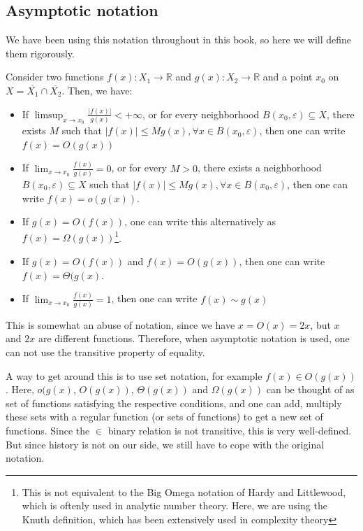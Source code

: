 \subsection{Asymptotic notation} %
\label{sub:Asymptotic notation}

We have been using this notation throughout in this book, so here we will define
them rigorously.

\begin{definition}
\label{def:Asymptotic notation}
  Consider two functions \( f(x): X_{1} \to  \mathbb{R} \) and \( g(x): X_{2}
  \to \mathbb{R} \) and a point \( x_{0} \) on \( X = \overline{X_{1}} \cap
  \overline{X_{2}}  \). Then, we have:
  \begin{itemize}
  \item If \( \limsup_{x \to x_{0}} \frac{|f(x)|}{g(x)} < +\infty \), or for every
    neighborhood \( B(x_{0}, \varepsilon) \subseteq X \), there exists \( M \)
    such that \( |f(x)| \le Mg(x), \forall x \in B(x_{0}, \varepsilon) \), then
    one can write \( f(x) = O(g(x)) \)
  \item If \( \lim_{x \to x_{0}} \frac{f(x)}{g(x)} = 0 \), or for every \( 
    M > 0\), there exists a neighborhood \( B(x_{0}, \varepsilon) \subseteq X\)
    such that \( |f(x)| \le Mg(x), \forall  x \in B(x_{0}, \varepsilon) \), then
    one can write \( f(x) = o(g(x)) \).
  \item If \( g(x) = O(f(x)) \), one can write this alternatively as \( f(x) =
    \Omega(g(x)) \)\footnote{This is not equivalent to the Big Omega notation of
    Hardy and Littlewood, which is oftenly used in analytic number theory. Here,
    we are using the Knuth definition, which has been extensively used in
    complexity theory}.
  \item If \( g(x) = O(f(x)) \) and \( f(x) = O(g(x)) \), then one can write \(
    f(x) = \Theta(g(x)\).
  \item If \( \lim_{x \to x_{0}} \frac{f(x)}{g(x)} = 1 \), then one can write \(
    f(x) \sim g(x)\)
  \end{itemize}
\end{definition}

This is somewhat an abuse of notation, since we have \( x = O(x) = 2x \), but \(
x\) and \( 2x \) are different functions. Therefore, when asymptotic notation is
used, one can not use the transitive property of equality.

A way to get around this is to use set notation, for example \( f(x) \in O(g(x))
\). Here, \( o(g(x) \), \( O(g(x)) \), \( \Theta(g(x)) \) and \( \Omega(g(x)) \)
can be thought of as set of functions satisfying the respective conditions, and one
can add, multiply these sets with a regular function (or sets of functions)
to get a new set of functions. Since the \( \in \) binary relation is not
transitive, this is very well-defined. But since history is not on our side, we
still have to cope with the original notation.

